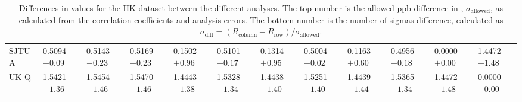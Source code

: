 \begin{landscape}
\begin{table}
\begin{tabularx}{1\linewidth}{@{\extracolsep{\fill}}lXXXXXXXXXXX}
	SJTU A & 0.5094 $+0.09$ & 0.5143 $-0.23$ & 0.5169 $-0.23$ & 0.1502 $+0.96$ & 0.5101 $+0.17$ & 0.1314 $+0.95$ & 0.5004 $+0.02$ & 0.1163 $+0.60$ & 0.4956 $+0.18$ & 0.0000 $+0.00$ & 1.4472 $+1.48$  \\
	UK Q   & 1.5421 $-1.36$ & 1.5454 $-1.46$ & 1.5470 $-1.46$ & 1.4443 $-1.38$ & 1.5328 $-1.34$ & 1.4438 $-1.40$ & 1.5251 $-1.40$ & 1.4439 $-1.44$ & 1.5365 $-1.34$ & 1.4472 $-1.48$ & 0.0000 $+0.00$  \\
  \bottomrule
\end{tabularx}
\caption[]{Differences in \R values for the HK dataset between the different analyses. The top number is the allowed ppb difference in \R, $\sigma_{\text{allowed}}$, as calculated from the correlation coefficients and analysis errors. The bottom number is the number of sigmas difference, calculated as $\sigma_{\text{diff}} = (R_{\text{column}}-R_{\text{row}})/\sigma_{\text{allowed}}$.}
\label{tab:HK_diff}
\end{table}
\end{landscape}




